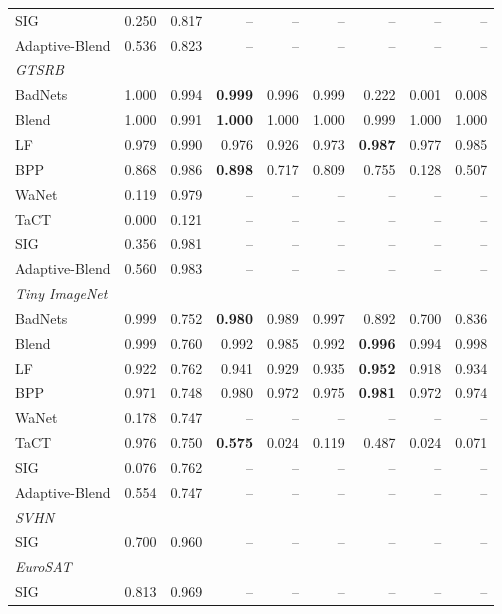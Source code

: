 \begin{table}[htbp]
\begin{tabular}{lrrrrrrrr}
SIG & 0.250 & 0.817 & -- & -- & -- & -- & -- & -- \\
Adaptive-Blend & 0.536 & 0.823 & -- & -- & -- & -- & -- & -- \\
\midrule
\multicolumn{9}{l}{\textit{GTSRB}} \\
BadNets & 1.000 & 0.994 & \textbf{0.999} & 0.996 & 0.999 & 0.222 & 0.001 & 0.008 \\
Blend & 1.000 & 0.991 & \textbf{1.000} & 1.000 & 1.000 & 0.999 & 1.000 & 1.000 \\
LF & 0.979 & 0.990 & 0.976 & 0.926 & 0.973 & \textbf{0.987} & 0.977 & 0.985 \\
BPP & 0.868 & 0.986 & \textbf{0.898} & 0.717 & 0.809 & 0.755 & 0.128 & 0.507 \\
WaNet & 0.119 & 0.979 & -- & -- & -- & -- & -- & -- \\
TaCT & 0.000 & 0.121 & -- & -- & -- & -- & -- & -- \\
SIG & 0.356 & 0.981 & -- & -- & -- & -- & -- & -- \\
Adaptive-Blend & 0.560 & 0.983 & -- & -- & -- & -- & -- & -- \\
\midrule
\multicolumn{9}{l}{\textit{Tiny ImageNet}} \\
BadNets & 0.999 & 0.752 & \textbf{0.980} & 0.989 & 0.997 & 0.892 & 0.700 & 0.836 \\
Blend & 0.999 & 0.760 & 0.992 & 0.985 & 0.992 & \textbf{0.996} & 0.994 & 0.998 \\
LF & 0.922 & 0.762 & 0.941 & 0.929 & 0.935 & \textbf{0.952} & 0.918 & 0.934 \\
BPP & 0.971 & 0.748 & 0.980 & 0.972 & 0.975 & \textbf{0.981} & 0.972 & 0.974 \\
WaNet & 0.178 & 0.747 & -- & -- & -- & -- & -- & -- \\
TaCT & 0.976 & 0.750 & \textbf{0.575} & 0.024 & 0.119 & 0.487 & 0.024 & 0.071 \\
SIG & 0.076 & 0.762 & -- & -- & -- & -- & -- & -- \\
Adaptive-Blend & 0.554 & 0.747 & -- & -- & -- & -- & -- & -- \\
\midrule
\multicolumn{9}{l}{\textit{SVHN}} \\
SIG & 0.700 & 0.960 & -- & -- & -- & -- & -- & -- \\
\midrule
\multicolumn{9}{l}{\textit{EuroSAT}} \\
SIG & 0.813 & 0.969 & -- & -- & -- & -- & -- & -- \\
\bottomrule
\end{tabular}
\end{table}
